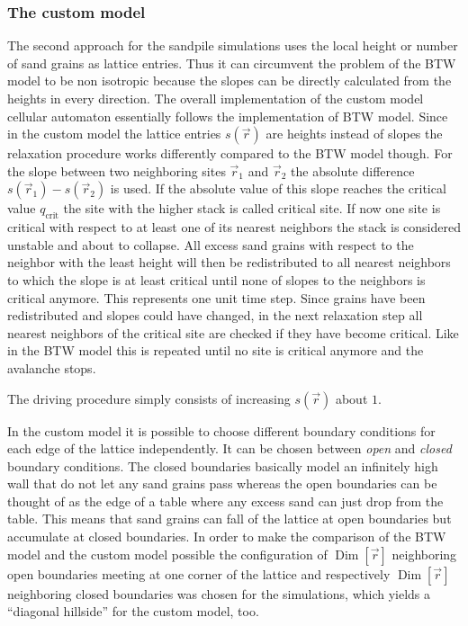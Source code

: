 \subsubsection{The custom model}
The second approach for the sandpile simulations uses the local height or number of sand grains as lattice entries.
Thus it can circumvent the problem of the BTW model to be non isotropic because the slopes can be directly calculated
from the heights in every direction.
The overall implementation of the custom model cellular automaton essentially follows the implementation of BTW model.
Since in the custom model the lattice entries $s(\vec{r})$ are heights instead of slopes the relaxation procedure
works differently compared to the BTW model though.
For the slope between two neighboring sites $\vec{r}_1$ and $\vec{r}_2$ the absolute difference
$s(\vec{r}_1)-s(\vec{r}_2)$ is used. If the absolute value of this slope reaches the critical value $q_{\mathrm{crit}}$
the site with the higher stack is called critical site. If now one site is critical with respect to at least one of its
nearest neighbors the stack is considered unstable and about to collapse. All excess sand grains with respect to the
neighbor with the least height will then be redistributed to all nearest neighbors to which the slope is at least
critical until none of slopes to the neighbors is critical anymore.
This represents one unit time step. Since grains have been redistributed and slopes could have changed, in the next
relaxation step all nearest neighbors of the critical site are checked if they have become critical. Like in the BTW
model this is repeated until no site is critical anymore and the avalanche stops.

The driving procedure simply consists of increasing $s(\vec{r})$ about $1$.

In the custom model it is possible to choose different boundary conditions for each edge of the lattice independently.
It can be chosen between \emph{open} and \emph{closed} boundary conditions. The closed boundaries basically model an
infinitely high wall that do not let any sand grains pass whereas the open boundaries can be thought of as the edge of
a table where any excess sand can just drop from the table. This means that sand grains can fall of the lattice at
open boundaries but accumulate at closed boundaries.
In order to make the comparison of the BTW model and the custom model possible the configuration of
$\operatorname{Dim}\left[\vec{r}\right]$ neighboring open boundaries meeting at one corner of the lattice and
respectively $\operatorname{Dim}\left[\vec{r}\right]$ neighboring closed boundaries was chosen for the simulations,
which yields a \enquote{diagonal hillside} for the custom model, too.

